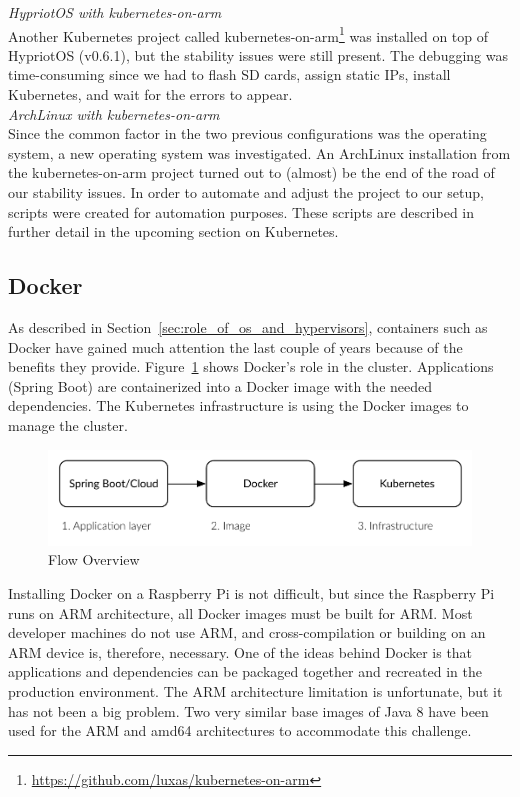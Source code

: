 \noindent
\textit{HypriotOS with kubernetes-on-arm} \\
Another Kubernetes project called kubernetes-on-arm\footnote{\url{https://github.com/luxas/kubernetes-on-arm}} was installed on top of HypriotOS (v0.6.1), but the stability issues were still present. The debugging was time-consuming since we had to flash SD cards, assign static IPs, install Kubernetes, and wait for the errors to appear. \\


\noindent
\textit{ArchLinux with kubernetes-on-arm} \\
Since the common factor in the two previous configurations was the operating system, a new operating system was investigated. An ArchLinux installation from the kubernetes-on-arm project turned out to (almost) be the end of the road of our stability issues. In order to automate and adjust the project to our setup, scripts were created for automation purposes. These scripts are described in further detail in the upcoming section on Kubernetes. \\


\subsection*{Docker}
As described in Section~\ref{sec:role_of_os_and_hypervisors}, containers such as Docker have gained much attention the last couple of years because of the benefits they provide. Figure~\ref{fig:flow_spring_software} shows Docker's role in the cluster. Applications (Spring Boot) are containerized into a Docker image with the needed dependencies. The Kubernetes infrastructure is using the Docker images to manage the cluster.
\begin{figure}[H]
    \centering
    \includegraphics[width=12cm]{figures/flow_overview}
    \caption{Flow Overview}
    \label{fig:flow_spring_software}
\end{figure}

\noindent
Installing Docker on a Raspberry Pi is not difficult, but since the Raspberry Pi runs on ARM architecture, all Docker images must be built for ARM. Most developer machines do not use ARM, and cross-compilation or building on an ARM device is, therefore, necessary. One of the ideas behind Docker is that applications and dependencies can be packaged together and recreated in the production environment. The ARM architecture limitation is unfortunate, but it has not been a big problem. Two very similar base images of Java 8 have been used for the ARM and amd64 architectures to accommodate this challenge.

